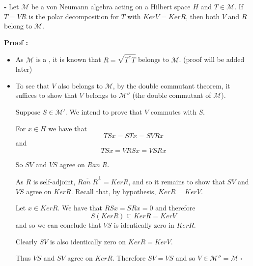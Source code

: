 \documentclass[12pt]{article}
\begin{document}
{\bf {} -} Let $\mathcal{M}$ be a von Neumann algebra acting on a Hilbert space $H$ and $T \in \mathcal{M}$. If $T = VR$ is the polar decomposition for $T$ with $Ker V = Ker R$, then both $V$ and $R$ belong to $\mathcal{M}$.

{\bf Proof :}
\begin{itemize}
\item As $\mathcal{M}$ is a , it is known that $R = \sqrt{T^*T}$ belongs to $\mathcal{M}$. (proof will be added later)

\item To see that $V$ also belongs to $\mathcal{M}$, by the double commutant theorem, it suffices to show that $V$ belongs to $\mathcal{M}''$ (the double commutant of $\mathcal{M}$).

Suppose $S \in \mathcal{M}'$. We intend to prove that $V$ commutes with $S$. 

For $x \in H$ we have that
\begin{displaymath}
TSx=STx=SVRx
\end{displaymath}
and
\begin{displaymath}
TSx=VRSx=VSRx
\end{displaymath}

So $SV$ and $VS$ agree on $\overline{Ran\; R}$.

As $R$ is self-adjoint, $\overline{Ran\; R}^{\perp}=KerR$, and so it remains to show that $SV$ and $VS$ agree on $Ker R$. Recall that, by hypothesis, $Ker R = Ker V$.

Let $x \in Ker R$. We have that $RSx=SRx=0$ and therefore
\begin{displaymath}
S(Ker R) \subseteq Ker R = Ker V
\end{displaymath}
and so we can conclude that $VS$ is identically zero in $Ker R$.

Clearly $SV$ is also identically zero on $Ker R = Ker V$.

Thus $VS$ and $SV$ agree on $Ker R$. Therefore $SV=VS$ and so $V \in \mathcal{M}''=\mathcal{M}\; \square$

\end{itemize}
\end{document}
